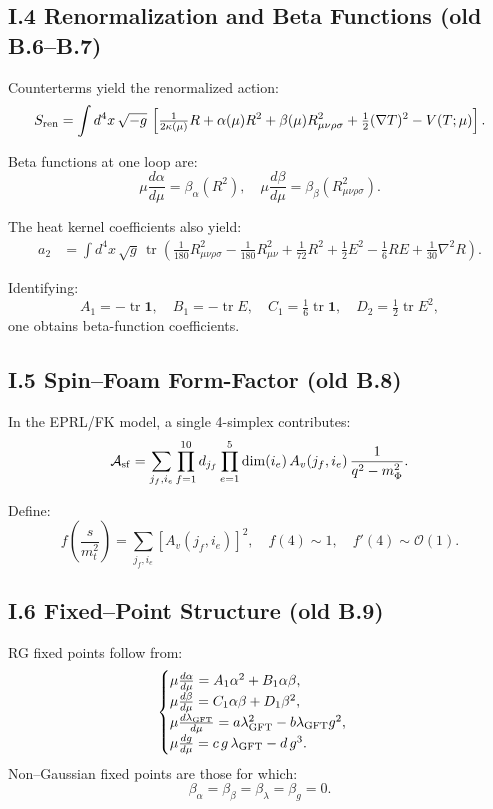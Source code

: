 \documentclass{article}
\DeclareMathOperator{\tr}{tr}
\begin{document}
\subsection*{I.4 Renormalization and Beta Functions (old B.6–B.7)}
Counterterms yield the renormalized action:
\[
  S_{\rm ren}
  = \int d^4x\,\sqrt{-g}\,
  \left[\tfrac1{2\kappa(\mu)}R
    +\alpha(\mu)R^2
    +\beta(\mu)R_{\mu\nu\rho\sigma}^2
    +\tfrac12(\nabla T)^2
    -V(T;\mu)\right].
\]

Beta functions at one loop are:
\[
\mu\frac{d\alpha}{d\mu}
  =\beta_\alpha(R^2),\quad
  \mu\frac{d\beta}{d\mu}
  =\beta_\beta(R_{\mu\nu\rho\sigma}^2).
\]

The heat kernel coefficients also yield:
\[
\begin{aligned}
  a_2 &= \int d^4x\,\sqrt{g}\,\tr\left(
    \tfrac1{180}R_{\mu\nu\rho\sigma}^2
   -\tfrac1{180}R_{\mu\nu}^2
   +\tfrac1{72}R^2
   +\tfrac12E^2
   -\tfrac16RE
   +\tfrac1{30}\nabla^2R
  \right).
\end{aligned}
\]

Identifying:
\[
A_1=-\tr\mathbf1,\quad
B_1=-\tr E,\quad
C_1=\tfrac16\tr\mathbf1,\quad
D_2=\tfrac12\tr E^2,
\]
one obtains beta-function coefficients.

\subsection*{I.5 Spin–Foam Form-Factor (old B.8)}
In the EPRL/FK model, a single 4-simplex contributes:
\[
\mathcal A_{\rm sf}
= \sum_{j_f,i_e}
  \prod_{f=1}^{10}d_{j_f}
  \prod_{e=1}^5 \dim(i_e)\,
  A_v(j_f,i_e)\,\frac{1}{q^2-m_\Phi^2}.
\]

Define:
\[
f\!\left(\frac{s}{m_t^2}\right)
= \sum_{j_f,i_e}\left[A_v(j_f,i_e)\right]^2,
\quad
f(4)\sim1,\quad
f'(4)\sim\mathcal O(1).
\]

\subsection*{I.6 Fixed–Point Structure (old B.9)}
RG fixed points follow from:
\[
\begin{cases}
  \mu\frac{d\alpha}{d\mu}
    =A_1\alpha^2 + B_1\alpha\beta,\\
  \mu\frac{d\beta}{d\mu}
    =C_1\alpha\beta + D_1\beta^2,\\
  \mu\frac{d\lambda_{\rm GFT}}{d\mu}
    =a\lambda_{\rm GFT}^2 - b\lambda_{\rm GFT}g^2,\\
  \mu\frac{dg}{d\mu}
    =c\,g\,\lambda_{\rm GFT} - d\,g^3.
\end{cases}
\]
Non–Gaussian fixed points are those for which:
\[
\beta_\alpha=\beta_\beta=\beta_\lambda=\beta_g=0.
\]
\end{document}
